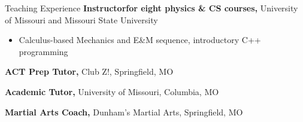 

\begin{rubric}{Teaching Experience\hfill\RMPlogo}
    \entry*[2018 -- 2022]%
        \textbf{Instructorfor eight physics \& CS courses,} University of Missouri and Missouri State University
        \begin{itemize}
            \item Calculus-based Mechanics and E\&M sequence, introductory C++ programming
        \end{itemize}
    
    \entry*[2018 -- 2021]%
        \textbf{ACT Prep Tutor,} Club Z!, Springfield, MO
    
    \entry*[2021 -- Present]%
        \textbf{Academic Tutor,} University of Missouri, Columbia, MO
    
    \entry*[2014 -- 2020]%
        \textbf{Martial Arts Coach,} Dunham's Martial Arts, Springfield, MO
\end{rubric}
